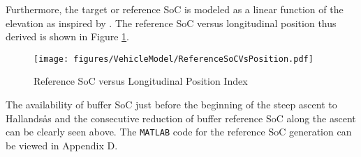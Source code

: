 \documentclass[MastersThesis.tex]{subfiles}
\begin{document}
Furthermore, the target or reference SoC is modeled as a linear function of the elevation as inspired by \cite{Guzzella}. The reference SoC versus longitudinal position thus derived is shown in Figure \ref{referenceSoCVsPosition}.\\

\begin{figure}[H]
	\begin{center}
	\texttt{[image: figures/VehicleModel/ReferenceSoCVsPosition.pdf]}
	\end{center}
	\caption{Reference SoC versus Longitudinal Position Index}
	\label{referenceSoCVsPosition}
\end{figure}

The availability of buffer SoC just before the beginning of the steep ascent to Hallands\aa s and the consecutive reduction of buffer reference SoC along the ascent can be clearly seen above. The \verb!MATLAB! code for the reference SoC generation can be viewed in Appendix D.\\

\newpage
\end{document}
